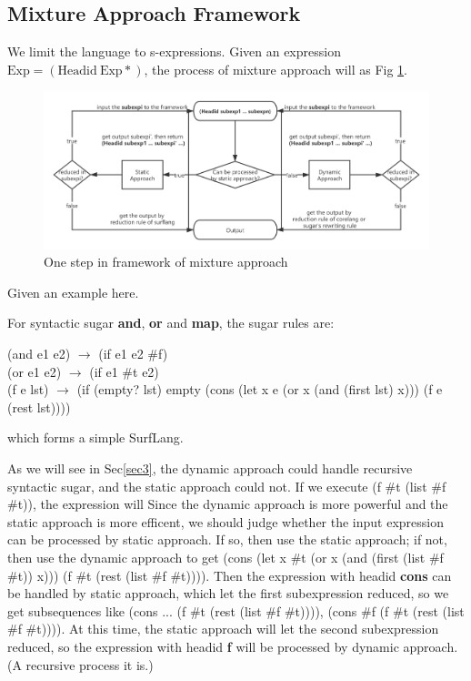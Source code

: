 \subsection{Mixture Approach Framework}
We limit the language to s-expressions. Given an expression $\mbox{Exp} = (\mbox{Headid}~\mbox{Exp}*)$, the process of mixture approach will as Fig \ref{fig:mixture}.

\begin{figure}[t]
	\centering
	\includegraphics[width=12cm]{images/mixture.png}
	\caption{One step in framework of mixture approach}
	\label{fig:mixture}
\end{figure}

Given an example here.

For syntactic sugar {\bfseries and}, {\bfseries or} and {\bfseries map}, the sugar rules are:
\begin{center}
	\parbox[t]{\textwidth}{%
		\begin{flushleft}  
			(and e1 e2) $\rightarrow$ (if e1 e2 \#f)\\
			(or e1 e2) $\rightarrow$ (if e1 \#t e2)\\
			(f e lst) $\rightarrow$ (if (empty? lst) empty (cons (let x e (or x (and (first lst) x))) (f e (rest lst))))
		\end{flushleft}  
	}%
\end{center}
which forms a simple SurfLang.

As we will see in Sec\ref{sec3}, the dynamic approach could handle recursive syntactic sugar, and the static approach could not. If we execute (f \#t (list \#f \#t)), the expression will
Since the dynamic approach is more powerful and the static approach is more efficent, we should judge whether the input expression can be processed by static approach. If so, then use the static approach; if not, then use the dynamic approach to get (cons (let x \#t (or x (and (first (list \#f \#t)) x))) (f \#t (rest (list \#f \#t)))). Then the expression with headid {\bfseries cons} can be handled by static approach, which let the first subexpression reduced, so we get subsequences like (cons ... (f \#t (rest (list \#f \#t)))), (cons \#f (f \#t (rest (list \#f \#t)))). At this time, the static approach will let the second subexpression reduced, so the expression with headid {\bfseries f} will be processed by dynamic approach. (A recursive process it is.) 

